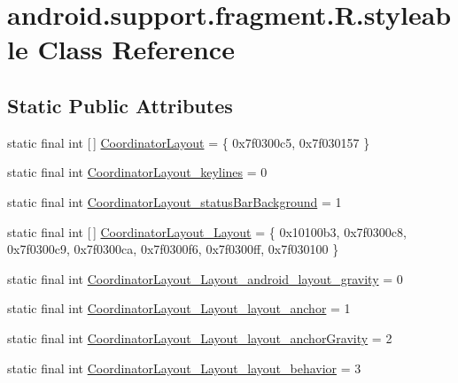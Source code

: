 \hypertarget{classandroid_1_1support_1_1fragment_1_1_r_1_1styleable}{}\section{android.\+support.\+fragment.\+R.\+styleable Class Reference}
\label{classandroid_1_1support_1_1fragment_1_1_r_1_1styleable}
\subsection*{Static Public Attributes}
\begin{DoxyCompactItemize}
\item 
static final int \mbox{[}$\,$\mbox{]} \mbox{\hyperlink{classandroid_1_1support_1_1fragment_1_1_r_1_1styleable_a521a79aec9d6ad82829b2373c3d24b89}{Coordinator\+Layout}} = \{ 0x7f0300c5, 0x7f030157 \}
\item 
static final int \mbox{\hyperlink{classandroid_1_1support_1_1fragment_1_1_r_1_1styleable_abcc7eeffcfd7f560975de2a46aae350d}{Coordinator\+Layout\+\_\+keylines}} = 0
\item 
static final int \mbox{\hyperlink{classandroid_1_1support_1_1fragment_1_1_r_1_1styleable_af8dc49bb59df1d3c8a46e97bff57639b}{Coordinator\+Layout\+\_\+status\+Bar\+Background}} = 1
\item 
static final int \mbox{[}$\,$\mbox{]} \mbox{\hyperlink{classandroid_1_1support_1_1fragment_1_1_r_1_1styleable_a102234181b330295e26a4e1bec8345fd}{Coordinator\+Layout\+\_\+\+Layout}} = \{ 0x10100b3, 0x7f0300c8, 0x7f0300c9, 0x7f0300ca, 0x7f0300f6, 0x7f0300ff, 0x7f030100 \}
\item 
static final int \mbox{\hyperlink{classandroid_1_1support_1_1fragment_1_1_r_1_1styleable_a75ee36169f10a37c8d655411da30a0a2}{Coordinator\+Layout\+\_\+\+Layout\+\_\+android\+\_\+layout\+\_\+gravity}} = 0
\item 
static final int \mbox{\hyperlink{classandroid_1_1support_1_1fragment_1_1_r_1_1styleable_a6b8e7dc943e672bb388b059521f62b47}{Coordinator\+Layout\+\_\+\+Layout\+\_\+layout\+\_\+anchor}} = 1
\item 
static final int \mbox{\hyperlink{classandroid_1_1support_1_1fragment_1_1_r_1_1styleable_a9a9e1a5379210d437e269b828c857e01}{Coordinator\+Layout\+\_\+\+Layout\+\_\+layout\+\_\+anchor\+Gravity}} = 2
\item 
static final int \mbox{\hyperlink{classandroid_1_1support_1_1fragment_1_1_r_1_1styleable_a977a54a05781897a8d4ac985629bc377}{Coordinator\+Layout\+\_\+\+Layout\+\_\+layout\+\_\+behavior}} = 3

\end{DoxyCompactItemize}
